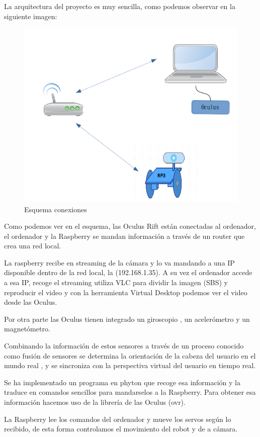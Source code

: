 \documentclass[twoside, 12pt]{epstfg}
\begin{document}
La arquitectura del proyecto es muy sencilla, como podemos observar en la siguiente imagen:

\begin{figure}[h]
	\centerline{
		\mbox{\includegraphics[width=.80\textwidth]{images/EsquemaConexiones.png}}
	}
	\caption{Esquema conexiones}
\end{figure}


Como podemos ver en el esquema, las Oculus Rift están conectadas al ordenador, el ordenador y la Raspberry se mandan información a través de un router que crea una red local.

La raspberry recibe en streaming de la cámara y lo va mandando a una IP disponible dentro de la red local, la (192.168.1.35). A su vez el ordenador accede a esa IP, recoge el streaming utiliza VLC para dividir la imagen (SBS) y reproducir el video y con la herramienta Virtual Desktop podemos ver el video desde las Oculus.

Por otra parte las Oculus tienen integrado un giroscopio , un acelerómetro y un magnetómetro.

Combinando la información de estos sensores a través de un proceso conocido como fusión de sensores se determina la orientación de la cabeza del usuario en el mundo real , y se sincroniza con la perspectiva virtual del usuario en tiempo real. 

Se ha implementado un programa en phyton que recoge esa información y la traduce en comandos sencillos para mandarselos a la Raspberry. Para obtener esa información hacemos uso de la librería de las Oculus (ovr).

La Raspberry lee los comandos del ordenador y mueve los servos según lo recibido, de esta forma controlamos el movimiento del robot y de a cámara.
\end{document}
